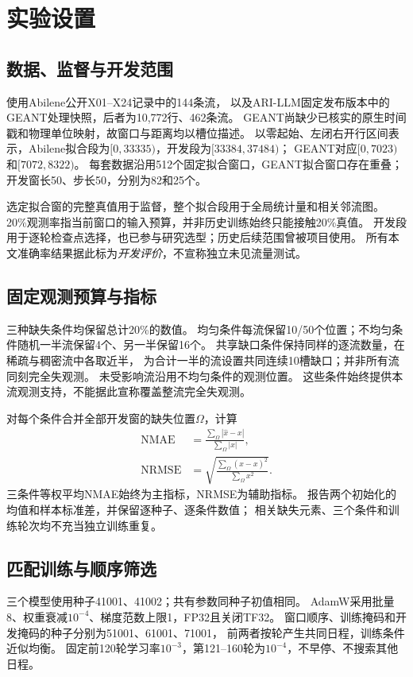 \section{实验设置}
\label{sec:experiments}

\subsection{数据、监督与开发范围}
使用Abilene公开X01--X24记录中的144条流\cite{abilene_data}，
以及ARI-LLM固定发布版本中的GEANT处理快照，后者为10,772行、462条流\cite{ari_release}。
GEANT尚缺少已核实的原生时间戳和物理单位映射，故窗口与距离均以槽位描述。
以零起始、左闭右开行区间表示，Abilene拟合段为$[0,33335)$，开发段为$[33384,37484)$；
GEANT对应$[0,7023)$和$[7072,8322)$。
每套数据沿用512个固定拟合窗口，GEANT拟合窗口存在重叠；
开发窗长50、步长50，分别为82和25个。

选定拟合窗的完整真值用于监督，整个拟合段用于全局统计量和相关邻流图。
20\%观测率指当前窗口的输入预算，并非历史训练始终只能接触20\%真值。
开发段用于逐轮检查点选择，也已参与研究选型；历史后续范围曾被项目使用。
所有本文准确率结果据此标为\emph{开发评价}，不宣称独立未见流量测试。

\subsection{固定观测预算与指标}
三种缺失条件均保留总计20\%的数值。
均匀条件每流保留10/50个位置；不均匀条件随机一半流保留4个、另一半保留16个。
共享缺口条件保持同样的逐流数量，在稀疏与稠密流中各取近半，
为合计一半的流设置共同连续10槽缺口；并非所有流同刻完全失观测。
未受影响流沿用不均匀条件的观测位置。
这些条件始终提供本流观测支持，不能据此宣称覆盖整流完全失观测。

对每个条件合并全部开发窗的缺失位置$\Omega$，计算
\begin{equation}
 \begin{aligned}
 \mathrm{NMAE}&=\frac{\sum_{\Omega}|\widehat x-x|}{\sum_{\Omega}|x|},\\
 \mathrm{NRMSE}&=\sqrt{\frac{\sum_{\Omega}(\widehat x-x)^2}{\sum_{\Omega}x^2}}.
 \end{aligned}
 \label{eq:metrics}
\end{equation}
三条件等权平均NMAE始终为主指标，NRMSE为辅助指标。
报告两个初始化的均值和样本标准差，并保留逐种子、逐条件数值；
相关缺失元素、三个条件和训练轮次均不充当独立训练重复。

\subsection{匹配训练与顺序筛选}
三个模型使用种子41001、41002；共有参数同种子初值相同。
AdamW采用批量8、权重衰减$10^{-4}$、梯度范数上限1，FP32且关闭TF32。
窗口顺序、训练掩码和开发掩码的种子分别为51001、61001、71001，
前两者按轮产生共同日程，训练条件近似均衡。
固定前120轮学习率$10^{-3}$，第121--160轮为$10^{-4}$，不早停、不搜索其他日程。

